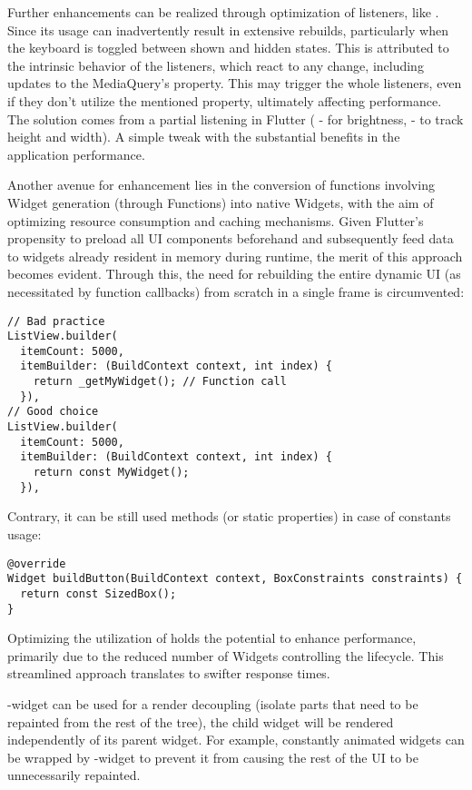 Further enhancements can be realized through optimization of listeners, like . 
Since its usage can inadvertently result in extensive rebuilds, particularly when the keyboard is toggled between 
shown and hidden states. This is attributed to the intrinsic behavior of the  listeners, which react to 
any change, including updates to the MediaQuery's  property. This may trigger the whole  
listeners, even if they don't utilize the mentioned property, ultimately affecting performance. The solution comes from 
a partial listening in Flutter ( - for brightness,  - to track
height and width). A simple tweak with the substantial benefits in the application performance.

Another avenue for enhancement lies in the conversion of functions involving Widget generation (through Functions) into 
native Widgets, with the aim of optimizing resource consumption and caching mechanisms. Given Flutter's propensity to 
preload all UI components beforehand and subsequently feed data to widgets already resident in memory during runtime, 
the merit of this approach becomes evident. Through this, the need for rebuilding the entire dynamic UI (as necessitated 
by function callbacks) from scratch in a single frame is circumvented:

\begin{lstlisting}
// Bad practice
ListView.builder(
  itemCount: 5000,
  itemBuilder: (BuildContext context, int index) {
    return _getMyWidget(); // Function call
  }),
// Good choice
ListView.builder(
  itemCount: 5000,
  itemBuilder: (BuildContext context, int index) {
    return const MyWidget();
  }),
\end{lstlisting}

\noindent Contrary, it can be still used methods (or static properties) in case of constants usage:

\begin{lstlisting}
@override
Widget buildButton(BuildContext context, BoxConstraints constraints) {
  return const SizedBox();
}
\end{lstlisting}

Optimizing the utilization of  holds the potential to enhance performance, primarily due to the 
reduced number of Widgets controlling the lifecycle. This streamlined approach translates to swifter response times.

-widget can be used for a render decoupling (isolate parts that need to be repainted from the rest 
of the tree), the child widget will be rendered independently of its parent widget. For example, constantly animated 
widgets can be wrapped by -widget to prevent it from causing the rest of the UI to be unnecessarily
repainted.

